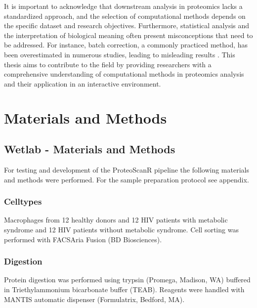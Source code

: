 \documentclass[
  11pt,
]{article}
\begin{document}
It is important to acknowledge that downstream analysis in proteomics
lacks a standardized approach, and the selection of computational
methods depends on the specific dataset and research objectives.
Furthermore, statistical analysis and the interpretation of biological
meaning often present misconceptions that need to be addressed. For
instance, batch correction, a commonly practiced method, has been
overestimated in numerous studies, leading to misleading results
\citep{Nygaard2016}. This thesis aims to contribute to the field by
providing researchers with a comprehensive understanding of
computational methods in proteomics analysis and their application in an
interactive environment.

\newpage

\hypertarget{materials-and-methods}{%
\section{Materials and Methods}\label{materials-and-methods}}

\hypertarget{wetlab---materials-and-methods}{%
\subsection{Wetlab - Materials and
Methods}\label{wetlab---materials-and-methods}}

For testing and development of the ProteoScanR pipeline the following
materials and methods were performed. For the sample preparation
protocol see appendix.

\hypertarget{celltypes}{%
\subsubsection{Celltypes}\label{celltypes}}

Macrophages from 12 healthy donors and 12 HIV patients with metabolic
syndrome and 12 HIV patients without metabolic syndrome. Cell sorting
was performed with FACSAria Fusion (BD Biosciences).

\hypertarget{digestion}{%
\subsubsection{Digestion}\label{digestion}}

Protein digestion was performed using trypsin (Promega, Madison, WA)
buffered in Triethylammonium bicarbonate buffer (TEAB). Reagents were
handled with MANTIS automatic dispenser (Formulatrix, Bedford, MA).
\end{document}
